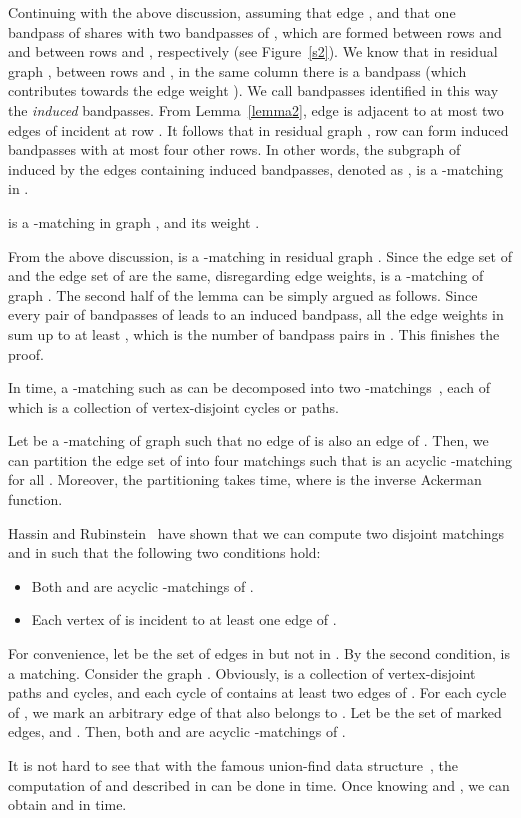 \documentclass[11pt,twoside]{article}\usepackage{amssymb,latexsym,graphicx,hyperref}\usepackage{epstopdf}
\newenvironment{proof}{{\sc Proof. }}{\hfill\vspace{0.2in}}
\begin{document}
Continuing with the above discussion, assuming that edge ,
and that one bandpass of  shares  with two bandpasses of ,
which are formed between rows  and  and between rows  and , respectively (see Figure~\ref{s2}).
We know that in residual graph , between rows  and , in the same column there is a bandpass
(which contributes  towards the edge weight ).
We call bandpasses identified in this way the {\em induced} bandpasses.
From Lemma~\ref{lemma2}, edge  is adjacent to at most two edges of  incident at row .
It follows that in residual graph , row  can form induced bandpasses with at most four other rows.
In other words, the subgraph of  induced by the edges containing induced bandpasses, denoted as , is a -matching in .


\begin{lemma}
\label{lemma3}
 is a -matching in graph , and its weight .
\end{lemma}
\begin{proof}
From the above discussion,  is a -matching in residual graph .
Since the edge set of  and the edge set of  are the same, disregarding edge weights,  is a -matching of graph .
The second half of the lemma can be simply argued as follows.
Since every pair of bandpasses of  leads to an induced bandpass, all the edge weights in  sum up to at least ,
which is the number of bandpass pairs in .
This finishes the proof.
\end{proof}


In  time, a -matching such as  can be decomposed into two -matchings~\cite{Har69,Die05},
each of which is a collection of vertex-disjoint cycles or paths.


\begin{lemma}
\label{lem:HR}
Let  be a -matching of graph  such that no edge of  is also an edge of .
Then, we can partition the edge set of  into four matchings  
such that  is an acyclic -matching for all .
Moreover, the partitioning takes  time, where  is the inverse Ackerman function. 
\end{lemma}
\begin{proof}
Hassin and Rubinstein~\cite{HR00} have shown that we can compute two disjoint matchings 
 and  in  such that the following two conditions hold:
\begin{itemize}
\item
	Both  and  are acyclic -matchings of .
\item
	Each vertex of  is incident to at least one edge of . 
\end{itemize}
For convenience, let  be the set of edges in  but not in .
By the second condition,  is a matching.
Consider the graph .
Obviously,  is a collection of vertex-disjoint paths and cycles, and each cycle of  contains at least two edges of .
For each cycle  of , we mark an arbitrary edge of  that also belongs to .
Let  be the set of marked edges, and .
Then, both  and  are acyclic -matchings of . 

It is not hard to see that with the famous union-find data structure~\cite{Tar75}, 
the computation of  and  described in \cite{HR00} can be done in  time.
Once knowing  and , we can obtain  and  in  time. 
\end{proof}
\end{document}
